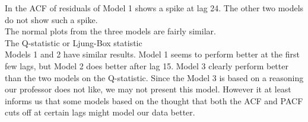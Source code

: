   In the ACF of residuals of Model 1 shows a spike at lag 24. The other two models do not show such a spike.\\
  
  The normal plots from the three models are fairly similar.\\
  
  The Q-statistic or Ljung-Box statistic\\
  
  Models 1 and 2 have similar results. Model 1 seems to perform better at the first few lags, but Model 2 does better after lag 15. Model 3 clearly perform better than the two models on the Q-statistic. Since the Model 3 is based on a reasoning our professor does not like, we may not present this model. However it at least informs us that some models based on the thought that both the ACF and PACF cuts off at certain lags might model our data better. 
  

